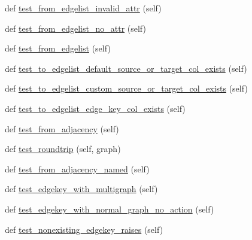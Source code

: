 \begin{DoxyCompactItemize}
\item 
def \hyperlink{classnetworkx_1_1tests_1_1test__convert__pandas_1_1TestConvertPandas_aadf1742e3b50b8686947b39b3b51e7b6}{test\+\_\+from\+\_\+edgelist\+\_\+invalid\+\_\+attr} (self)
\item 
def \hyperlink{classnetworkx_1_1tests_1_1test__convert__pandas_1_1TestConvertPandas_a4b012b29cda1e63e0286a1876d0702c9}{test\+\_\+from\+\_\+edgelist\+\_\+no\+\_\+attr} (self)
\item 
def \hyperlink{classnetworkx_1_1tests_1_1test__convert__pandas_1_1TestConvertPandas_a269925d2000fe7a0ba62645739a78a32}{test\+\_\+from\+\_\+edgelist} (self)
\item 
def \hyperlink{classnetworkx_1_1tests_1_1test__convert__pandas_1_1TestConvertPandas_ab628b25bbe71b78ff6d1b78b02f514ee}{test\+\_\+to\+\_\+edgelist\+\_\+default\+\_\+source\+\_\+or\+\_\+target\+\_\+col\+\_\+exists} (self)
\item 
def \hyperlink{classnetworkx_1_1tests_1_1test__convert__pandas_1_1TestConvertPandas_adf49040ec0a14dddcdec17e49846b493}{test\+\_\+to\+\_\+edgelist\+\_\+custom\+\_\+source\+\_\+or\+\_\+target\+\_\+col\+\_\+exists} (self)
\item 
def \hyperlink{classnetworkx_1_1tests_1_1test__convert__pandas_1_1TestConvertPandas_acb3bc934660ef0e707294195bded760f}{test\+\_\+to\+\_\+edgelist\+\_\+edge\+\_\+key\+\_\+col\+\_\+exists} (self)
\item 
def \hyperlink{classnetworkx_1_1tests_1_1test__convert__pandas_1_1TestConvertPandas_a4e4bb1bc2c9a75e9f2912a2eb7f977f9}{test\+\_\+from\+\_\+adjacency} (self)
\item 
def \hyperlink{classnetworkx_1_1tests_1_1test__convert__pandas_1_1TestConvertPandas_a23541b6ee90c25bcaaa18c9feef585ce}{test\+\_\+roundtrip} (self, graph)
\item 
def \hyperlink{classnetworkx_1_1tests_1_1test__convert__pandas_1_1TestConvertPandas_a60fbc82465063f0f7f65ccbf2201ec19}{test\+\_\+from\+\_\+adjacency\+\_\+named} (self)
\item 
def \hyperlink{classnetworkx_1_1tests_1_1test__convert__pandas_1_1TestConvertPandas_ad14ac0dab3978f552c78c10e28149396}{test\+\_\+edgekey\+\_\+with\+\_\+multigraph} (self)
\item 
def \hyperlink{classnetworkx_1_1tests_1_1test__convert__pandas_1_1TestConvertPandas_a51cffba93552f1ca3080dbc44c5d8c3c}{test\+\_\+edgekey\+\_\+with\+\_\+normal\+\_\+graph\+\_\+no\+\_\+action} (self)
\item 
def \hyperlink{classnetworkx_1_1tests_1_1test__convert__pandas_1_1TestConvertPandas_a44a457c0da3c9d0443119ab3a2e198a0}{test\+\_\+nonexisting\+\_\+edgekey\+\_\+raises} (self)
\end{DoxyCompactItemize}
